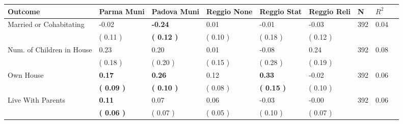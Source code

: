 \begin{tabular}{L{6.2cm} C{1.8cm} C{1.8cm} C{1.8cm} C{1.8cm} C{1.8cm} C{1.8cm} C{0.3cm} C{0.3cm}}
\toprule
 \textbf{Outcome} & \textbf{Parma Muni} & \textbf{Padova Muni} & \textbf{Reggio None} & \textbf{Reggio Stat} & \textbf{Reggio Reli} & \textbf{N} & \textbf{$ R^2$} \\
\midrule
Married or Cohabitating &     -0.02 & \textbf{    -0.24} &      0.01 &     -0.01 &     -0.03  & 392 &       0.04 \\ 
 & (     0.11 ) & \textbf{(     0.12 )} & (     0.10 ) & (     0.18 ) & (     0.12 )  & \\
Num. of Children in House &      0.23 &      0.20 &      0.01 &     -0.08 &      0.24  & 392 &       0.08 \\ 
 & (     0.18 ) & (     0.20 ) & (     0.15 ) & (     0.28 ) & (     0.19 )  & \\
Own House & \textbf{     0.17} & \textbf{     0.26} &      0.12 & \textbf{     0.33} &     -0.02  & 392 &       0.06 \\ 
 & \textbf{(     0.09 )} & \textbf{(     0.10 )} & (     0.08 ) & \textbf{(     0.15 )} & (     0.10 )  & \\
Live With Parents & \textbf{     0.11} &      0.07 &      0.06 &     -0.03 &     -0.00  & 392 &       0.06 \\ 
 & \textbf{(     0.06 )} & (     0.07 ) & (     0.05 ) & (     0.10 ) & (     0.07 )  & \\
\bottomrule
\end{tabular}

